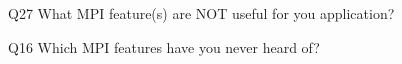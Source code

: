 \begin{description}%
\item{Q27} What MPI feature(s) are NOT useful for you application?%
\item{Q16} Which MPI features have you never heard of?%
\end{description}%
